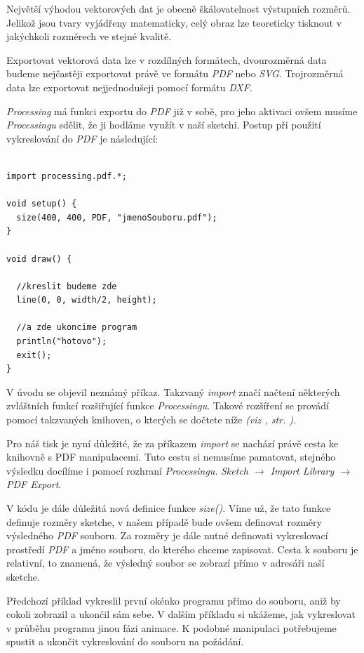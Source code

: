 \documentclass[10pt,twoside=true,open=right,cleardoublepage=empty,chapterprefix=true]{scrbook}
\newcommand{\vyraz}[1]{\textit{\gls{#1}}\index{#1}\label{#1}}
\newcommand{\odkaz}[1]{\textit{(viz \nameref{#1}, str. \pageref*{#1})}}
\begin{document}
 Největší výhodou vektorových dat je obecně škálovatelnost výstupních rozměrů. Jelikož jsou tvary vyjádřeny matematicky, celý obraz lze teoreticky tisknout v jakýchkoli rozměrech ve stejné kvalitě.
 
 Exportovat vektorová data lze v rozdílných formátech, dvourozměrná data budeme nejčastěji exportovat právě ve formátu {\em PDF} nebo {\em SVG}. Trojrozměrná data lze exportovat nejjednodušeji pomocí formátu {\em DXF}.
 
    {\em Processing} má funkci exportu do {\em PDF} již v sobě, pro jeho aktivaci ovšem musíme {\em Processingu} sdělit, že ji hodláme využít v naší sketchi.
    \newpage
 Postup při použití vykreslování do {\em PDF} je následující:
 
\begin{lstlisting} 

import processing.pdf.*;

void setup() {
  size(400, 400, PDF, "jmenoSouboru.pdf");
}

void draw() {

  //kreslit budeme zde
  line(0, 0, width/2, height);

  //a zde ukoncime program
  println("hotovo");
  exit();
}

\end{lstlisting}

V úvodu se objevil neznámý příkaz. Takzvaný \vyraz{import} značí načtení některých zvláštních funkcí rozšiřující funkce {\em Processingu}. Takové rozšíření se provádí pomocí takzvaných knihoven, o kterých se dočtete níže \odkaz{Knihovny}. 

Pro náš tisk je nyní důležité, že za příkazem \vyraz{import} se nachází právě cesta ke knihovně s PDF manipulacemi. Tuto cestu si nemusíme pamatovat, stejného výsledku docílíme i pomocí rozhraní {\em Processingu}. {\em Sketch $\rightarrow$ Import Library $\rightarrow$ PDF Export}.

V kódu je dále důležitá nová definice funkce \vyraz{size()}. Víme už, že tato funkce definuje rozměry sketche, v našem případě bude ovšem definovat rozměry výsledného {\em PDF} souboru. Za rozměry je dále nutné definovati vykreslovací prostředí {\em PDF} a jméno souboru, do kterého chceme zapisovat. Cesta k souboru je relativní, to znamená, že výsledný soubor se zobrazí přímo v adresáři naší sketche.

 Předchozí příklad vykreslil první okénko programu přímo do souboru, aniž by cokoli zobrazil a ukončil sám sebe. V dalším příkladu si ukážeme, jak vykreslovat v průběhu programu jinou fázi animace. K podobné manipulaci potřebujeme spustit a ukončit vykreslování do souboru na požádání.
 
\end{document}
